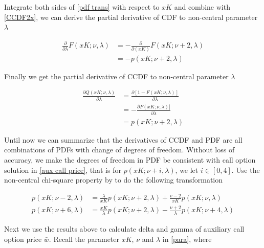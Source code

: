 \noindent Integrate both sides of \eqref{pdf trans} with respect to $xK$ and combine with \eqref{CCDF2x}, we can derive the partial derivative of CDF to non-central parameter $\lambda$

\begin{equation}
    \begin{aligned}
        \frac{\partial}{\partial \lambda} F(xK;\nu,\lambda)&=-\frac{\partial}{\partial (xK)}F(xK;\nu+2,\lambda) \\
        &= -p(xK;\nu+2,\lambda)
    \end{aligned}
\end{equation}

\noindent Finally we get the partial derivative of CCDF to non-central parameter $\lambda$

\begin{equation}\label{CCDF2lambda}
    \begin{aligned}
        \frac{\partial Q(xK; \nu, \lambda)}{\partial \lambda}&=\frac{\partial[1-F(xK; \nu, \lambda)]}{\partial \lambda} \\ 
        &=-\frac{\partial F(xK; \nu, \lambda)]}{\partial \lambda}\\
        &= p(xK;\nu+2,\lambda)
    \end{aligned}
\end{equation}

Until now we can summarize that the derivatives of CCDF and PDF are all combinations of PDFs with change of degrees of freedom. Without loss of accuracy, we make the degrees of freedom in PDF be consistent with call option solution in \eqref{aux call price}, that is for $p(xK;\nu+i, \lambda)$, we let $i \in [0,4]$. Use the non-central chi-square property by \cite{cohen_noncentral_1988} to do the following transformation

\begin{equation}\label{trans}
    \begin{aligned}
        p(xK ; \nu-2, \lambda)&=\frac{\lambda}{xK} p(xK ; \nu+2, \lambda)+\frac{v-2}{xK} p(xK ; \nu, \lambda) \\
        p(xK ; \nu+6, \lambda)&=\frac{xK}{\lambda} p(xK ; \nu+2, \lambda)-\frac{\nu+2}{\lambda} p(xK ; \nu+4, \lambda)
    \end{aligned}
\end{equation}

Next we use the results above to calculate delta and gamma of auxiliary call option price $\bar{w}$. Recall the parameter $xK$, $\nu$ and $\lambda$ in \eqref{para}, where

